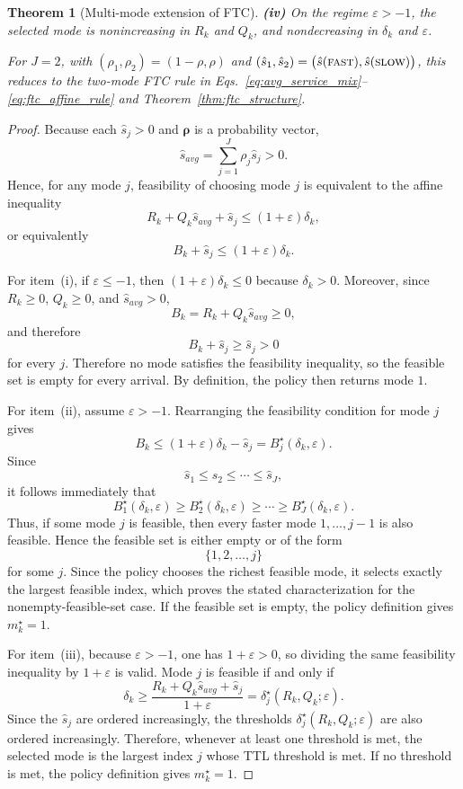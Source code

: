 \documentclass[fleqn,12pt,lineno]{wlpeerj}
\newtheorem{theorem}{Theorem}[section]
\begin{document}
\begin{theorem}[Multi-mode extension of FTC]
\noindent\textbf{(iv)} On the regime $\varepsilon > -1$, the selected mode is nonincreasing in
$R_k$ and $Q_k$, and nondecreasing in $\delta_k$ and $\varepsilon$.

For $J=2$, with $(\rho_1,\rho_2)=(1-\rho,\rho)$ and
$(\hat{s}_1,\hat{s}_2)=\bigl(\hat{s}(\textsc{fast}),\hat{s}(\textsc{slow})\bigr)$, this reduces to the
two-mode FTC rule in Eqs.~\eqref{eq:avg_service_mix}--\eqref{eq:ftc_affine_rule} and Theorem~\ref{thm:ftc_structure}.
\end{theorem}

\begin{proof}
Because each $\hat{s}_j > 0$ and $\boldsymbol{\rho}$ is a probability vector,
\[
\hat{s}_{avg} = \sum_{j=1}^J \rho_j \hat{s}_j > 0.
\]
Hence, for any mode $j$, feasibility of choosing mode $j$ is equivalent to
the affine inequality
\[
R_k + Q_k \hat{s}_{avg} + \hat{s}_j \le (1+\varepsilon)\delta_k,
\]
or equivalently
\[
B_k + \hat{s}_j \le (1+\varepsilon)\delta_k.
\]

For item~(i), if $\varepsilon \le -1$, then $(1+\varepsilon)\delta_k \le 0$ because
$\delta_k > 0$. Moreover, since $R_k \ge 0$, $Q_k \ge 0$, and $\hat{s}_{avg} > 0$,
\[
B_k = R_k + Q_k \hat{s}_{avg} \ge 0,
\]
and therefore
\[
B_k + \hat{s}_j \ge \hat{s}_j > 0
\]
for every $j$. Therefore no mode satisfies the feasibility inequality, so the
feasible set is empty for every arrival. By definition, the policy then returns
mode $1$.

For item~(ii), assume $\varepsilon > -1$. Rearranging the feasibility condition for
mode $j$ gives
\[
B_k \le (1+\varepsilon)\delta_k - \hat{s}_j = B_j^\star(\delta_k,\varepsilon).
\]
Since
\[
\hat{s}_1 \le \hat{s}_2 \le \cdots \le \hat{s}_J,
\]
it follows immediately that
\[
B_1^\star(\delta_k,\varepsilon) \ge B_2^\star(\delta_k,\varepsilon) \ge \cdots
\ge B_J^\star(\delta_k,\varepsilon).
\]
Thus, if some mode $j$ is feasible, then every faster mode
$1,\dots,j-1$ is also feasible. Hence the feasible set is either empty or of
the form
\[
\{1,2,\dots,j\}
\]
for some $j$. Since the policy chooses the richest feasible mode, it selects
exactly the largest feasible index, which proves the stated characterization
for the nonempty-feasible-set case. If the feasible set is empty, the policy
definition gives $m_k^\star=1$.

For item~(iii), because $\varepsilon > -1$, one has $1+\varepsilon > 0$, so dividing the
same feasibility inequality by $1+\varepsilon$ is valid. Mode $j$ is feasible if
and only if
\[
\delta_k \ge
\frac{R_k + Q_k \hat{s}_{avg} + \hat{s}_j}{1+\varepsilon}
=
\delta_j^\star(R_k,Q_k;\varepsilon).
\]
Since the $\hat{s}_j$ are ordered increasingly, the thresholds
$\delta_j^\star(R_k,Q_k;\varepsilon)$ are also ordered increasingly. Therefore,
whenever at least one threshold is met, the selected mode is the largest index
$j$ whose TTL threshold is met. If no threshold is met, the policy definition
gives $m_k^\star=1$.


\end{proof}
\end{document}
